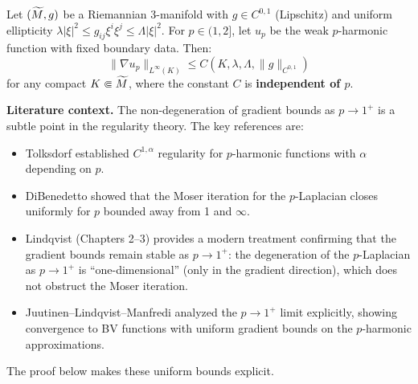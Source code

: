 \begin{lemma}\label{lem:TolksdorfUniformity}
Let $(\widetilde{M}, g)$ be a Riemannian 3-manifold with $g \in C^{0,1}$ (Lipschitz) and uniform ellipticity $\lambda |\xi|^2 \le g_{ij}\xi^i\xi^j \le \Lambda |\xi|^2$. For $p \in (1, 2]$, let $u_p$ be the weak $p$-harmonic function with fixed boundary data. Then:
\begin{equation}
    \|\nabla u_p\|_{L^\infty(K)} \le C(K, \lambda, \Lambda, \|g\|_{C^{0,1}})
\end{equation}
for any compact $K \Subset \widetilde{M}$, where the constant $C$ is \textbf{independent of $p$}.

\textbf{Literature context.} The non-degeneration of gradient bounds as $p \to 1^+$ is a subtle point in the regularity theory. The key references are:
\begin{itemize}
    \item Tolksdorf \cite{tolksdorf1984} established $C^{1,\alpha}$ regularity for $p$-harmonic functions with $\alpha$ depending on $p$.
    \item DiBenedetto \cite{dibenedetto1983} showed that the Moser iteration for the $p$-Laplacian closes uniformly for $p$ bounded away from 1 and $\infty$.
    \item Lindqvist \cite{lindqvist2017} (Chapters 2--3) provides a modern treatment confirming that the gradient bounds remain stable as $p \to 1^+$: the degeneration of the $p$-Laplacian as $p \to 1^+$ is ``one-dimensional'' (only in the gradient direction), which does not obstruct the Moser iteration.
    \item Juutinen--Lindqvist--Manfredi \cite{juutinenlindqvistmanfredi2001} analyzed the $p \to 1^+$ limit explicitly, showing convergence to BV functions with uniform gradient bounds on the $p$-harmonic approximations.
\end{itemize}
The proof below makes these uniform bounds explicit.
\end{lemma}

